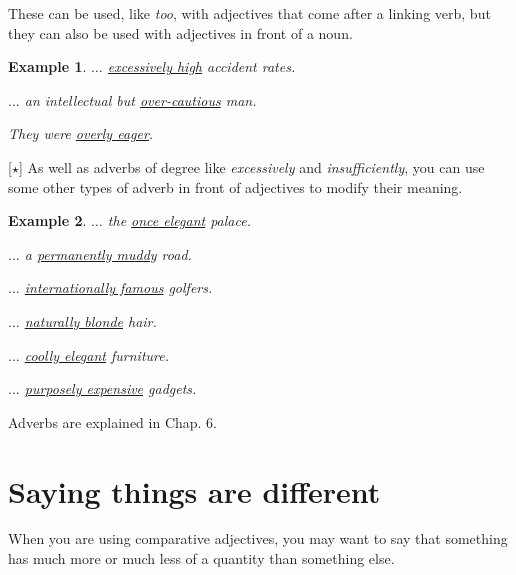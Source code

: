 \documentclass[oneside]{book}
\numberwithin{equation}{section}
\newtheorem{example}{Example}[section]
\begin{document}
These can be used, like \textit{too}, with adjectives that come after a linking verb, but they can also be used with adjectives in front of a noun.
\begin{example}
    $\ldots$ \underline{excessively high} accident rates.
    
    $\ldots$ an intellectual but \underline{over-cautious} man.
    
    They were \underline{overly eager}.
\end{example}
%
\noindent{} [$\star$] As well as adverbs of degree like \textit{excessively} and \textit{insufficiently}, you can use some other types of adverb in front of adjectives to modify their meaning.
\begin{example}
    $\ldots$ the \underline{once elegant} palace.
    
    $\ldots$ a \underline{permanently muddy} road.
    
    $\ldots$ \underline{internationally famous} golfers.
    
    $\ldots$ \underline{naturally blonde} hair.
    
    $\ldots$ \underline{coolly elegant} furniture.
    
    $\ldots$ \underline{purposely expensive} gadgets.
\end{example}
Adverbs are explained in Chap. 6.

\section{Saying things are different}
\noindent{} When you are using comparative adjectives, you may want to say that something has much more or much less of a quantity than something else.
\end{document}

